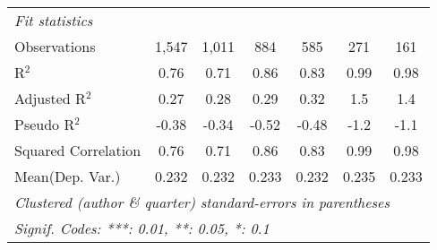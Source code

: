 \begin{tabular}{lcccccc}
   \midrule
   \emph{Fit statistics}\\
   Observations                                               & 1,547          & 1,011         & 884     & 585            & 271            & 161\\  
   R$^2$                                                      & 0.76           & 0.71          & 0.86    & 0.83           & 0.99           & 0.98\\  
   Adjusted R$^2$                                             & 0.27           & 0.28          & 0.29    & 0.32           & 1.5            & 1.4\\  
   Pseudo R$^2$                                               & -0.38          & -0.34         & -0.52   & -0.48          & -1.2           & -1.1\\  
   Squared Correlation                                        & 0.76           & 0.71          & 0.86    & 0.83           & 0.99           & 0.98\\  
Mean(Dep. Var.) & 0.232 & 0.232 & 0.233 & 0.232 & 0.235 & 0.233 \\
   \midrule \midrule
   \multicolumn{7}{l}{\emph{Clustered (author \& quarter) standard-errors in parentheses}}\\
   \multicolumn{7}{l}{\emph{Signif. Codes: ***: 0.01, **: 0.05, *: 0.1}}\\
\end{tabular}
\par\endgroup
